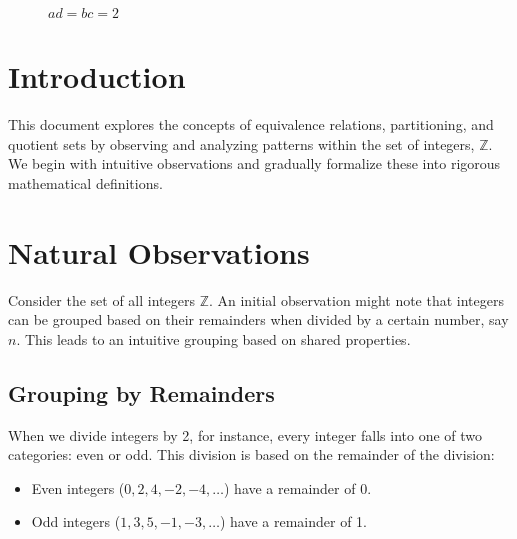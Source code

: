 \documentclass[11pt,openany]{article}
\begin{document}
\begin{figure}[h!]
\begin{tikzpicture}[scale=0.5]
%	
%	
	
\end{tikzpicture}
\caption{$ad=bc=2$}
\end{figure}

\newpage
\section{Introduction}
This document explores the concepts of equivalence relations, partitioning, and quotient sets by observing and analyzing patterns within the set of integers, \( \mathbb{Z} \). We begin with intuitive observations and gradually formalize these into rigorous mathematical definitions.

\section{Natural Observations}
Consider the set of all integers \( \mathbb{Z} \). An initial observation might note that integers can be grouped based on their remainders when divided by a certain number, say \( n \). This leads to an intuitive grouping based on shared properties.

\subsection{Grouping by Remainders}
When we divide integers by 2, for instance, every integer falls into one of two categories: even or odd. This division is based on the remainder of the division:
\begin{itemize}
	\item Even integers (\(0, 2, 4, -2, -4, \dots\)) have a remainder of 0.
	\item Odd integers (\(1, 3, 5, -1, -3, \dots\)) have a remainder of 1.
\end{itemize}
\end{document}
